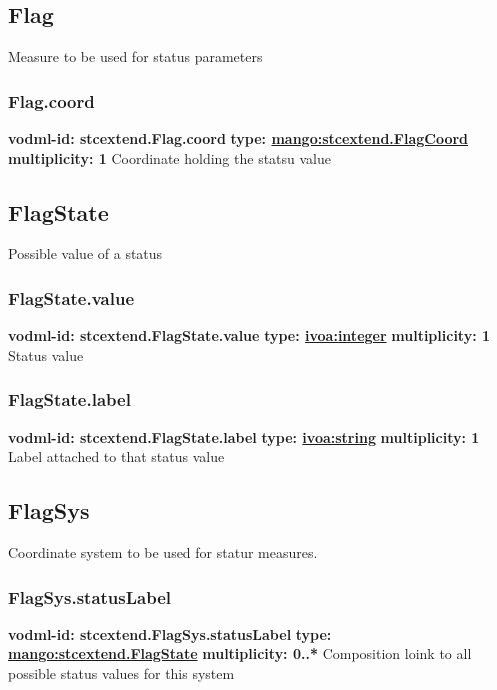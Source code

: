   \subsection{Flag}
  \label{sect:stcextend.Flag}
    Measure to be used for status parameters

    \subsubsection{Flag.coord}
      \textbf{vodml-id: stcextend.Flag.coord} \newline
      \textbf{type: \hyperref[sect:stcextend.FlagCoord]{mango:stcextend.FlagCoord}} \newline
      \textbf{multiplicity: 1} \newline 
      Coordinate holding the statsu value

  \subsection{FlagState}
  \label{sect:stcextend.FlagState}
    Possible value of a status

    \subsubsection{FlagState.value}
      \textbf{vodml-id: stcextend.FlagState.value} \newline
      \textbf{type: \hyperref[sect:ivoa]{ivoa:integer}} \newline
      \textbf{multiplicity: 1} \newline 
      Status value

    \subsubsection{FlagState.label}
      \textbf{vodml-id: stcextend.FlagState.label} \newline
      \textbf{type: \hyperref[sect:ivoa]{ivoa:string}} \newline
      \textbf{multiplicity: 1} \newline 
      Label attached to that status value

  \subsection{FlagSys}
  \label{sect:stcextend.FlagSys}
    Coordinate system to be used for statur measures.

    \subsubsection{FlagSys.statusLabel}
      \textbf{vodml-id: stcextend.FlagSys.statusLabel} \newline
      \textbf{type: \hyperref[sect:stcextend.FlagState]{mango:stcextend.FlagState}} \newline
      \textbf{multiplicity: 0..*} \newline 
      Composition loink to all possible status values for this system

